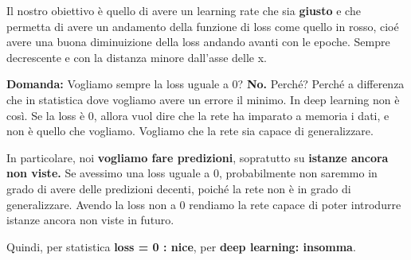 Il nostro obiettivo è quello di avere un learning rate che sia \textbf{giusto}
e che permetta di avere un andamento della funzione di loss come quello in
rosso, cioé avere una buona diminuizione della loss andando avanti con le
epoche. Sempre decrescente e con la distanza minore dall'asse delle x.

\textbf{Domanda:} Vogliamo sempre la loss uguale a 0? \textbf{No.}
Perché? Perché a differenza che in statistica dove vogliamo avere un errore il minimo.
In deep learning non è così. Se la loss è 0, allora vuol dire che la rete ha
imparato a memoria i dati, e non è quello che vogliamo. Vogliamo che la rete
sia capace di generalizzare.

In particolare, noi \textbf{vogliamo fare predizioni}, sopratutto su
\textbf{istanze ancora non viste.} Se avessimo una loss uguale a 0,
probabilmente non saremmo in grado di avere delle predizioni decenti, poiché la
rete non è in grado di generalizzare. Avendo la loss non a 0 rendiamo la rete
capace di poter introdurre istanze ancora non viste in futuro.

Quindi, per statistica \textbf{loss = 0 : nice}, per \textbf{deep learning:
    insomma}.
